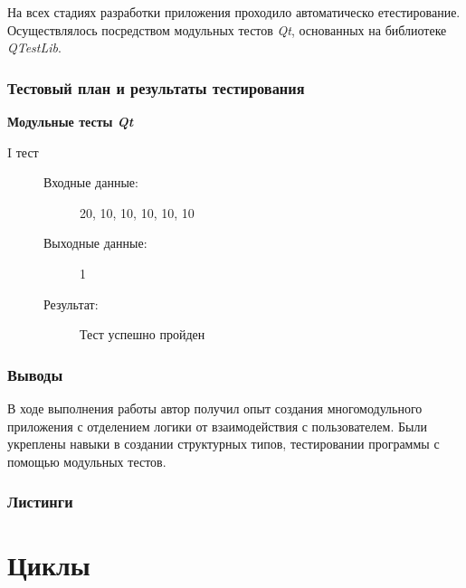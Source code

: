 \documentclass[12pt,a4paper]{report}
\begin{document}
На всех стадиях разработки приложения проходило автоматическо етестирование. Осуществлялось посредством модульных тестов \textit{Qt}, основанных на библиотеке  \textit{QTestLib}. 

\subsection{Тестовый план и результаты тестирования}

\item \textbf{Модульные тесты \textit{Qt}}
\begin{description}
\item[I тест]
\hspace{\parindent}
\begin{flushleft}
\begin{description}
\item[Входные данные:] 20, 10, 10, 10, 10, 10
\item[Выходные данные:] 1
\item[Результат:] Тест успешно пройден
\end{description}
\end{flushleft}
\end{description}

\subsection{Выводы}
В ходе выполнения работы автор получил опыт создания многомодульного приложения с отделением логики от взаимодействия с пользователем. Были укреплены навыки в создании структурных типов, тестировании программы с помощью модульных тестов.
\subsection*{Листинги}
\begin{itemize}

\end{itemize}

%
\chapter{Циклы}
\end{document}

